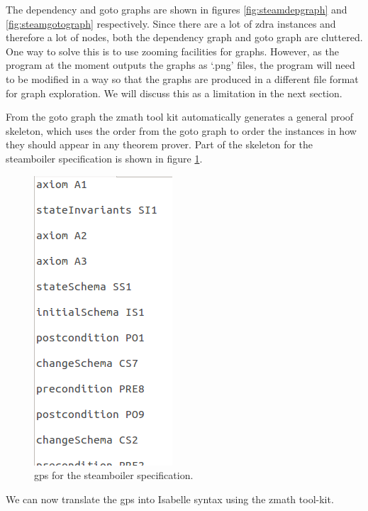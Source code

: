 The dependency and goto graphs are shown in figures \ref{fig:steamdepgraph} and
\ref{fig:steamgotograph} respectively. Since there are a lot of \gls{zdra}
instances and therefore a lot of nodes, both the dependency graph and goto graph
are cluttered. One way to solve this is to use zooming facilities for graphs.
However, as the program at the moment outputs the graphs as `.png' files, the
program will need to be modified in a way so that the graphs are produced in a 
different file format for graph exploration.
 We will discuss this as a limitation in the next section.

From the goto graph the \gls{zmath} tool kit automatically generates a general
proof skeleton, which uses the order from the goto graph to order the instances
in how they should appear in any theorem prover. Part of the skeleton for the
steamboiler specification is shown in figure \ref{fig:steamgpsa}.

\begin{figure}[H]
\includegraphics[scale=0.5]{Figures/Evaluation/steamboilergpsa.png}
\caption{\Gls{gps} for the steamboiler specification. \label{fig:steamgpsa}}
\end{figure}

We can now translate the \gls{gps} into Isabelle syntax using the \gls{zmath}
tool-kit.

